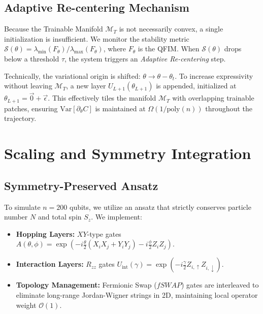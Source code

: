 \documentclass[aps,prx,reprint,superscriptaddress,amsmath,amssymb]{revtex4-2}
\newcommand{\Var}{\mathrm{Var}}
\newcommand{\poly}{\mathrm{poly}}
\newcommand{\McalT}{\mathcal{M}_T}
\begin{document}
\subsection{Adaptive Re-centering Mechanism}
Because the Trainable Manifold $\McalT$ is not necessarily convex, a single initialization is insufficient. We monitor the stability metric $\mathcal{S}(\theta) = \lambda_{\min}(F_\theta)/\lambda_{\max}(F_\theta)$, where $F_\theta$ is the QFIM. When $\mathcal{S}(\theta)$ drops below a threshold $\tau$, the system triggers an \textit{Adaptive Re-centering} step.

Technically, the variational origin is shifted: $\theta \to \theta - \theta_t$. To increase expressivity without leaving $\McalT$, a new layer $U_{L+1}(\theta_{L+1})$ is appended, initialized at $\theta_{L+1} = \vec{0} + \vec{\epsilon}$. This effectively tiles the manifold $\McalT$ with overlapping trainable patches, ensuring $\Var[\partial_\theta C]$ is maintained at $\Omega(1/\poly(n))$ throughout the trajectory.

\section{Scaling and Symmetry Integration}
\subsection{Symmetry-Preserved Ansatz}
To simulate $n=200$ qubits, we utilize an ansatz that strictly conserves particle number $N$ and total spin $S_z$. We implement:
\begin{itemize}
\item \textbf{Hopping Layers:} $XY$-type gates $A(\theta, \phi) = \exp\left( -i \frac{\theta}{2} (X_i X_j + Y_i Y_j) - i \frac{\phi}{2} Z_i Z_j \right)$.
\item \textbf{Interaction Layers:} $R_{zz}$ gates $U_{\text{int}}(\gamma) = \exp\left( -i \frac{\gamma}{2} Z_{i, \uparrow} Z_{i, \downarrow} \right)$.
\item \textbf{Topology Management:} Fermionic Swap ($fSWAP$) gates are interleaved to eliminate long-range Jordan-Wigner strings in 2D, maintaining local operator weight $\mathcal{O}(1)$.
\end{itemize}
\end{document}
